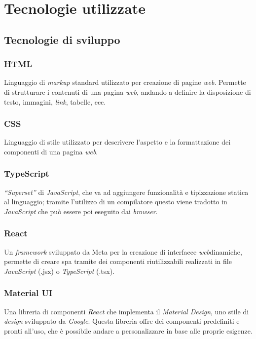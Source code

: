 \pagebreak
\section{Tecnologie utilizzate}
\label{sez:tecnologie-utilizzate}

\subsection{Tecnologie di sviluppo}
\label{sez:tecnologie-sviluppo}

\subsubsection{HTML}

Linguaggio di \textit{markup} standard utilizzato per creazione di pagine \textit{web}.
Permette di strutturare i contenuti di una pagina \textit{web}, andando a definire la disposizione di testo, immagini, \textit{link}, tabelle, ecc.

\subsubsection{CSS}
Linguaggio di stile utilizzato per descrivere l’aspetto e la formattazione dei componenti di una pagina \textit{web}.

\subsubsection{TypeScript}

\textit{“Superset”} di \textit{JavaScript}, che va ad aggiungere funzionalità e tipizzazione statica al linguaggio; 
tramite l’utilizzo di un compilatore questo viene tradotto in \textit{JavaScript} che può essere poi eseguito dai \textit{browser}.

\subsubsection{React}
Un \textit{framework} sviluppato da Meta per la creazione di interfacce \textit{web}dinamiche, permette di creare \gls{spa} tramite dei componenti riutilizzabili realizzati in file \textit{JavaScript} (.jsx) o \textit{TypeScript} (.tsx).

\subsubsection{Material UI}

Una libreria di componenti \textit{React} che implementa il \textit{Material Design}, uno stile di \textit{design} sviluppato da \textit{Google}.
Questa libreria offre dei componenti predefiniti e pronti all’uso, che è possibile andare a personalizzare in base alle proprie esigenze.

